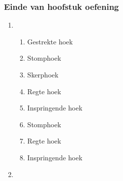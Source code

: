 {\begin{multicols}{3}
\subsubsection*{Einde van hoofstuk oefening} %
\begin{enumerate}[noitemsep, label=\textbf{\arabic*}.]
      \item %
	  \begin{enumerate}[noitemsep, label=\textbf{(\alph*)} ]
		\item Gestrekte hoek
\item Stomphoek
\item Skerphoek
\item Regte hoek
\item Inspringende hoek
\item Stomphoek
\item Regte hoek
\item Inspringende hoek
	  \end{enumerate}

      \item %
      \begin{enumerate}[noitemsep, label=\textbf{(\alph*)} ]


\end{enumerate}
\end{enumerate}
\end{multicols}}

